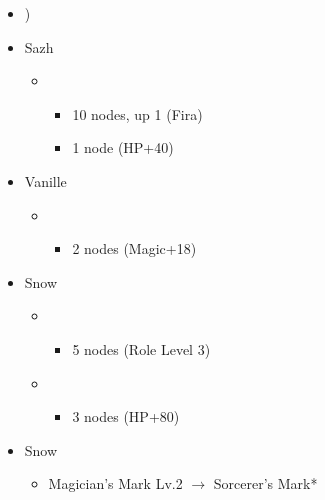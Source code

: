 \begin{menu}
	\begin{itemize}
		\paradigm
		\begin{itemize}
			\item {}%
				  {\paradigmline[4]{\syn}{\med}{(\com})}%
			      {\paradigmline{\rav}{(\rav)}{\rav}}%
			      {\paradigmline{\syn}{\med}{\com}}%
			      {\paradigmline{\syn}{\sab}{\rav}}%
			      {\paradigmline{\com}{(\rav)}{\com}}%
			      {\paradigmline{(\rav)}{(\rav)}{(\com)}}
		\end{itemize}
		\crystarium
		\begin{itemize}
			\item Sazh
				\begin{itemize}
					\item \rav
				    	\begin{itemize}
					    	\item 10 nodes, up 1 (Fira)
							\item 1 node (HP+40)
				        \end{itemize}
			    \end{itemize}
			\item Vanille
				\begin{itemize}
					\item \med
				    	\begin{itemize}
					    	\item 2 nodes (Magic+18)
				        \end{itemize}
			    \end{itemize}
			\item Snow
				\begin{itemize}
					\item \rav
						\begin{itemize}
							\item 5 nodes (Role Level 3)
						\end{itemize}
					\item \sen
						\begin{itemize}
							\item 3 nodes (HP+80)
						\end{itemize}
				\end{itemize}
		\end{itemize}
		\equip
		\begin{itemize}
			\item Snow
				\begin{itemize}
					\item Magician's Mark Lv.2 $\rightarrow$ Sorcerer's Mark*

\end{itemize}
\end{itemize}
\end{itemize}
\end{menu}
